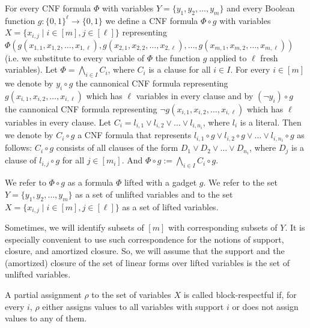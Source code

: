 \documentclass[10pt,a4paper]{article}
\begin{document}
For every CNF formula $\Phi$ with variables $Y=\{y_{1},y_{2},\dots,y_{m}\}$ and every Boolean function
$g\colon\{0,1\}^{\ell}\to\{0,1\}$ we define a CNF formula $\Phi\circ g$ with variables $X=\{x_{i,j}\mid i\in[m],j\in[\ell]\}$ representing
$\Phi(g(x_{1,1},x_{1,2},\dots,x_{1,\ell}),g(x_{2,1},x_{2,2},\dots,x_{2,\ell}),\dots,g(x_{m,1},x_{m,2},\dots,x_{m,\ell}))$ (i.e. we substitute to every variable of $\Phi$ the function $g$ applied to $\ell$
fresh variables). Let $\Phi=\bigwedge\limits_{i\in I}C_{i}$, where $C_{i}$ is a clause for all $i\in I$. For every $i\in[m]$ we denote by $y_{i}\circ g$ the cannonical CNF formula representing $g(x_{i,1},x_{i,2},\dots,x_{i,\ell})$ which has $\ell$ variables in every clause and by $(\lnot y_{i})\circ g$ the cannonical CNF formula representing $\lnot g(x_{i,1},x_{i,2},\dots,x_{i,\ell})$ which has $\ell$ variables in every clause. Let $C_{i}=l_{i,1}\lor l_{i,2}\lor\dots\lor l_{i,n_{i}}$, where $l_{i}$
is a literal. Then we denote by $C_{i}\circ g$ a CNF formula that represents $l_{i,1}\circ g\lor l_{i,2}\circ g\lor\dots\lor l_{i,n_{i}}\circ g$ as follows: $C_{i}\circ g$ consists of all clauses of the form $D_{1}\lor D_{2}\lor\dots\lor D_{n_{i}}$, where $D_{j}$ is a clause of $l_{i,j}\circ g$ for all $j\in[m_{i}]$. And $\Phi\circ g:=\bigwedge\limits_{i\in I}C_{i}\circ g$.\par



We refer to $\Phi\circ g$ as a formula $\Phi$ lifted with a gadget $g$. We refer to the set $Y=\{y_{1},y_{2},\dots,y_{m}\}$ as a set of unlifted variables and to the set $X=\{x_{i,j}\mid i\in[m],j\in[\ell]\}$ as a set of lifted variables.\par



Sometimes, we will identify subsets of $[m]$ with corresponding subsets of $Y$. It is especially convenient to use such correspondence for the notions of support, closure, and amortized closure. So, we will assume that the support and the (amortized) closure of the set of linear forms over lifted variables is the set of unlifted variables.\par



A partial assignment $\rho$ to the set of variables $X$ is called block-respectful if, for every $i$, $\rho$ either assigns values to all variables with support $i$ or does not assign values to any of them.\par
\end{document}
